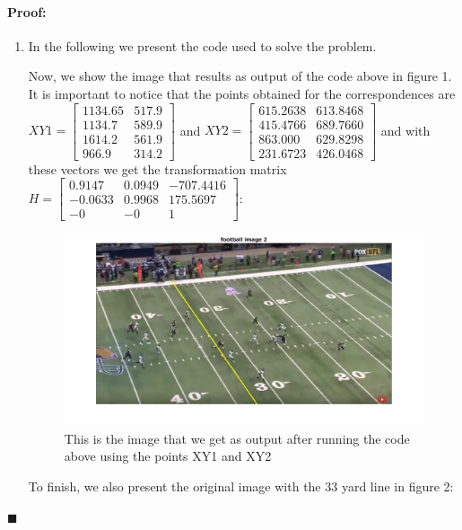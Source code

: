 \documentclass[12pt]{article}
\newenvironment{proof}{\paragraph{Proof: }}{\hfill$\blacksquare$}
\begin{document}
\begin{proof}
\begin{enumerate}
\item In the following we present the code used to solve the problem. 



Now, we show the image that results as output of the code above in figure 1. It is important to notice that the points obtained for the correspondences are $XY1 = \left[\begin{matrix} 1134.65 & 517.9 \\ 1134.7 & 589.9 \\ 1614.2 & 561.9 \\ 966.9 & 314.2 \end{matrix}\right]$ and $XY2 = \left[\begin{matrix} 615.2638 & 613.8468 \\ 415.4766 & 689.7660 \\ 863.000 & 629.8298 \\ 231.6723 & 426.0468 \end{matrix}\right]$ and with these vectors we get the transformation matrix $H = \left[\begin{matrix} 0.9147 & 0.0949 & -707.4416 \\ -0.0633 & 0.9968 & 175.5697 \\ -0 & -0 & 1 \end{matrix} \right]$:

\begin{figure}[h]
\begin{center}
\centering
\includegraphics[scale=0.3]{problem1_output.jpg}
\caption{This is the image that we get as output after running the code above using the points XY1 and XY2}
\label{fig:mesh1}
\end{center}
\end{figure}

To finish, we also present the original image with the 33 yard line in figure 2:


\end{enumerate}
\end{proof}
\end{document}
